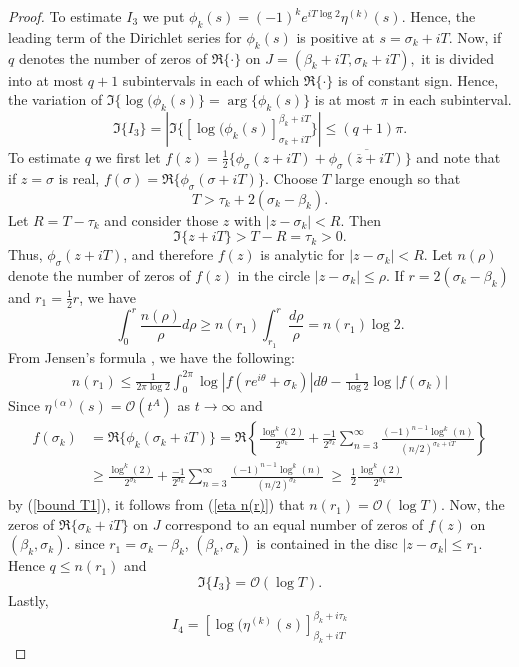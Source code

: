 \documentclass{amsart}
\theoremstyle{plain}
\theoremstyle{definition}
\newcommand{\etalpha}{\eta^{(\alpha)}}
\begin{document}
\begin{proof}
To estimate $I_3$ we put $ \phi_{k}(s) = (-1)^{k}e^{iT\log 2}\eta^{(k)}(s)$. 
Hence, the leading term of the Dirichlet series for $\phi_{k}(s)$ is positive at $s=\sigma_{k}+iT$. 
Now, if $q$ denotes the number of zeros of $\Re\{\cdot\}$ on $J=(\beta_{k}+iT, \sigma_{k}+iT),$ it is divided into at most $q+1$ subintervals in each of which $\Re\{\cdot\}$ is of constant sign. Hence, the variation of $\Im\{\log(\phi_{k}(s)\}=\arg\{\phi_{k}(s)\}$ is at most $\pi$ in each subinterval.
\[\Im\{I_3\}=|\Im\{[\log(\phi_{k}(s)]_{\sigma_{k}+iT}^{\beta_{k}+iT}\}|\leq (q+1)\pi.\]
To estimate $q$ we first let 
\(f(z) = \frac{1}{2}\{\phi_{\sigma}(z+iT)+\overline{\phi_{\sigma}(\overline{z}+iT)}\}\)
and note that if $z=\sigma$ is real,
\(f(\sigma)=\Re\{\phi_{\sigma}(\sigma+iT)\}\).
Choose $T$ large enough so that 
\[T>\tau_{k}+2(\sigma_{k}-\beta_{k}).\]
Let $R=T-\tau_{k}$ and consider those $z$ with $|z-\sigma_{k}|<R$. Then 
\[\Im\{z+iT\}>T-R=\tau_{k}>0.\]
Thus, $\phi_{\sigma}(z+iT)$, and therefore $f(z)$ is analytic for $|z-\sigma_{k}|<R$. Let $n(\rho)$ denote the number of zeros of $f(z)$ in the circle $|z-\sigma_{k}|\leq \rho.$ If $r=2(\sigma_{k}-\beta_{k})$ and $r_1=\frac{1}{2}r$, we have
\[\int_0^r\frac{n(\rho)}{\rho}d\rho\geq n(r_1)\int_{r_1}^r\frac{d\rho}{\rho}=n(r_1)\log 2.\]
From Jensen's formula \cite{Jensen}, we have the following:
\begin{align}\label{eta n(r)}
    n(r_1)\leq \frac{1}{2\pi\log 2}\int_0^{2\pi}\log|f(re^{i\theta}+\sigma_{k})|d\theta-\frac{1}{\log 2}\log|f(\sigma_{k})|
\end{align}
Since $\etalpha(s)=\mathcal{O}(t^A)$ as $t \to \infty$ and 
\begin{align*}
    f(\sigma_{k})&= \Re\{\phi_{k}(\sigma_{k}+iT)\} =\Re\left\{\frac{\log^{k}(2)}{2^{\sigma_{k}}}+\frac{-1}{2^{\sigma_{k}}}\sum_{n=3}^{\infty}\frac{(-1)^{n-1}\log^{k}(n)}{(n/2)^{\sigma_{k}+iT}}\right\}\\
    &\geq \frac{\log^{k}(2)}{2^{\sigma_{k}}}+\frac{-1}{2^{\sigma_{k}}}\sum_{n=3}^{\infty}\frac{(-1)^{n-1}\log^{k}(n)}{(n/2)^{\sigma_{k}}} \; \geq \; \frac{1}{2}\frac{\log^{k}(2)}{2^{\sigma_k}}
\end{align*}
by (\ref{bound T1}), it follows from (\ref{eta n(r)}) that $n(r_1)=\mathcal{O}(\log T).$ Now, the zeros of $\Re\{\sigma_k+iT\}$ on $J$ correspond to an equal number of zeros of $f(z)$ on $(\beta_{k},\sigma_{k}).$ since $r_1=\sigma_{k}-\beta_{k}$, $(\beta_{k},\sigma_{k})$ is contained in the disc $|z-\sigma_{k}|\leq r_1.$ Hence $q\leq n(r_1)$ and 
\[\Im\{I_3\}=\mathcal{O}(\log T).\]
Lastly,
\[I_4=[\log(\eta^{(k)}(s)]_{\beta_{k}+iT}^{\beta_{k}+i\tau_{k}}\]

\end{proof}
\end{document}
